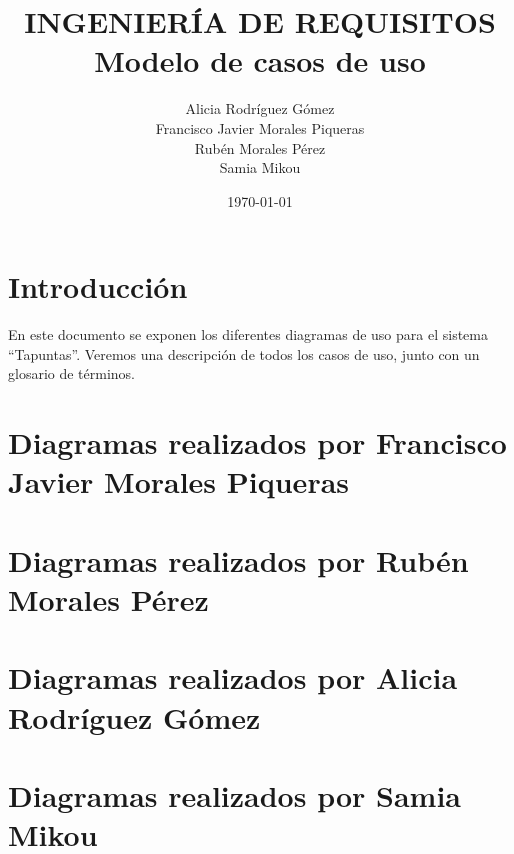 \documentclass[11pt,spanish]{article} %
\title{INGENIERÍA DE REQUISITOS \\
	Modelo de casos de uso}
\author{Alicia Rodríguez Gómez \\
	Francisco Javier Morales Piqueras \\
	Rubén Morales Pérez \\
	Samia Mikou}
\date{\today}
\begin{document}
\maketitle
\tableofcontents %
\setlength\parindent{0pt} %

\vspace{5cm}
\section{Introducción}
En este documento se exponen los diferentes diagramas de uso  para el sistema “Tapuntas”. Veremos una descripción de todos los casos de uso, junto con un glosario de términos.



\section{Diagramas realizados por Francisco Javier Morales Piqueras}


\newpage


\section{Diagramas realizados por Rubén Morales Pérez}


\newpage

\section{Diagramas realizados por Alicia Rodríguez Gómez}


\newpage

\section{Diagramas realizados por Samia Mikou}

\newpage
\end{document}
